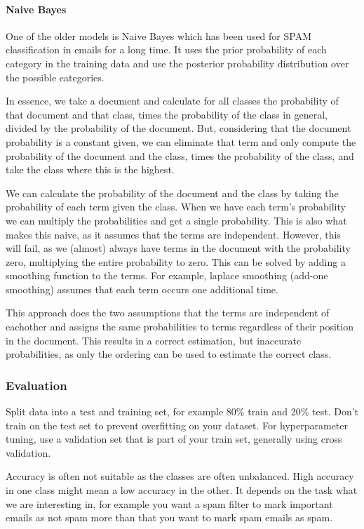 \paragraph{Naive Bayes}

One of the older models is Naive Bayes which has been used for SPAM
classification
in emails for a long time. It uses the prior probability of each category in the
training data and use the posterior probability distribution over the
possible categories.

In essence, we take a document and calculate for all classes the
probability of that document
and that class, times the probability of the class in general,
divided by the probability of
the document. But, considering that the document probability is a
constant given, we can eliminate
that term and only compute the probability of the document and the
class, times the probability of
the class, and take the class where this is the highest.

We can calculate the probability of the document and the class by
taking the probability of each
term given the class. When we have each term's probability we can
multiply the probabilities and
get a single probability. This is also what makes this naive, as it
assumes that the terms are
independent.
However, this will fail, as we (almost) always have terms in the
document with the probability zero,
multiplying the entire probability to zero. This can be solved by
adding a smoothing function to the
terms. For example, laplace smoothing (add-one smoothing) assumes
that each term occurs one additional
time.

This approach does the two assumptions that the terms are independent
of eachother and assigns the same
probabilities to terms regardless of their position in the document.
This results in a correct estimation, but inaccurate probabilities,
as only the ordering
can be used to estimate the correct class.

\subsubsection{Evaluation}

Split data into a test and training set, for example 80\% train and
20\% test. Don't train on the
test set to prevent overfitting on your dataset. For hyperparameter
tuning, use a validation set that
is part of your train set, generally using cross validation.

Accuracy is often not suitable as the classes are often unbalanced.
High accuracy in one class might mean
a low accuracy in the other. It depends on the task what we are
interesting in, for example you want a spam
filter to mark important emails as not spam more than that you want
to mark spam emails as spam.


